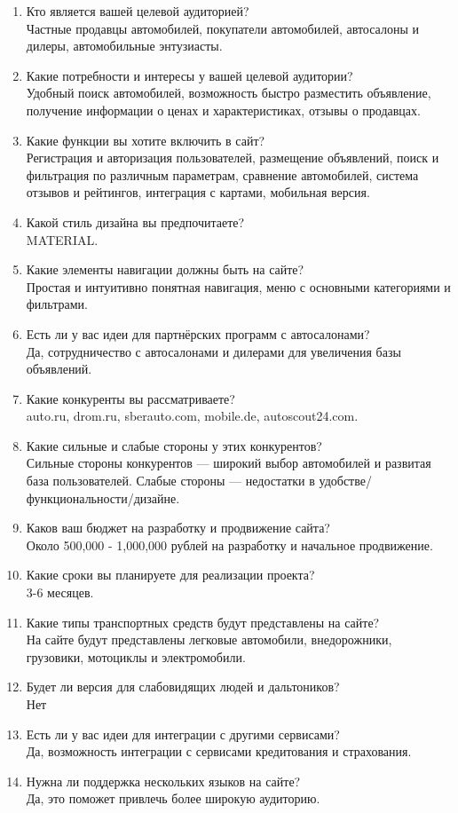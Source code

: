 \begin{enumerate}
    \item Кто является вашей целевой аудиторией?\\
        Частные продавцы автомобилей, покупатели автомобилей, автосалоны и дилеры, автомобильные энтузиасты.
    \item Какие потребности и интересы у вашей целевой аудитории?\\
        Удобный поиск автомобилей, возможность быстро разместить объявление, получение информации о ценах и характеристиках, отзывы о продавцах.
    \item Какие функции вы хотите включить в сайт?\\
        Регистрация и авторизация пользователей, размещение объявлений, поиск и фильтрация по различным параметрам, сравнение автомобилей, система отзывов и рейтингов, интеграция с картами, мобильная версия.
    \item Какой стиль дизайна вы предпочитаете?\\
        MATERIAL.
    \item Какие элементы навигации должны быть на сайте?\\
        Простая и интуитивно понятная навигация, меню с основными категориями и фильтрами.
    \item Есть ли у вас идеи для партнёрских программ с автосалонами?\\
        Да, сотрудничество с автосалонами и дилерами для увеличения базы объявлений.
    \item Какие конкуренты вы рассматриваете?\\
        auto.ru, drom.ru, sberauto.com, mobile.de, autoscout24.com.
    \item Какие сильные и слабые стороны у этих конкурентов?\\
        Сильные стороны конкурентов — широкий выбор автомобилей и развитая база пользователей. Слабые стороны — недостатки в удобстве/функциональности/дизайне.
    \item Каков ваш бюджет на разработку и продвижение сайта?\\
        Около 500,000 - 1,000,000 рублей на разработку и начальное продвижение.
    \item Какие сроки вы планируете для реализации проекта?\\
        3-6 месяцев.
    \item Какие типы транспортных средств будут представлены на сайте?\\
         На сайте будут представлены легковые автомобили, внедорожники, грузовики, мотоциклы и электромобили.
    \item Будет ли версия для слабовидящих людей и дальтоников?\\
        Нет
    \item Есть ли у вас идеи для интеграции с другими сервисами?\\
        Да, возможность интеграции с сервисами кредитования и страхования.
    \item Нужна ли поддержка нескольких языков на сайте?\\
        Да, это поможет привлечь более широкую аудиторию.
\end{enumerate}
\bigskip

